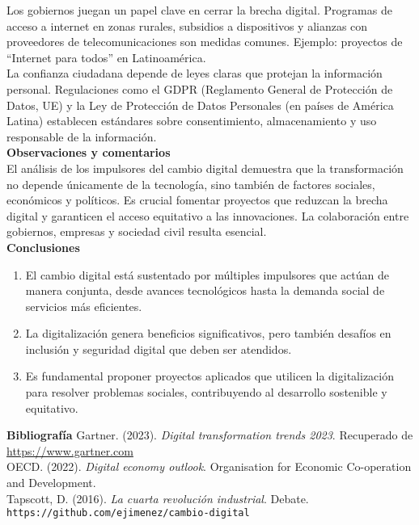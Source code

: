 \documentclass[12pt]{article}
\begin{document}
Los gobiernos juegan un papel clave en cerrar la brecha digital. Programas de acceso a internet en zonas rurales, subsidios a dispositivos y alianzas con proveedores de telecomunicaciones son medidas comunes. Ejemplo: proyectos de “Internet para todos” en Latinoamérica.\\

La confianza ciudadana depende de leyes claras que protejan la información personal. Regulaciones como el GDPR (Reglamento General de Protección de Datos, UE) y la Ley de Protección de Datos Personales (en países de América Latina) establecen estándares sobre consentimiento, almacenamiento y uso responsable de la información.\\


\textbf{Observaciones y comentarios}\\
El análisis de los impulsores del cambio digital demuestra que la transformación no depende 
únicamente de la tecnología, sino también de factores sociales, económicos y políticos. 
Es crucial fomentar proyectos que reduzcan la brecha digital y garanticen el acceso equitativo 
a las innovaciones. La colaboración entre gobiernos, empresas y sociedad civil resulta esencial.\\

\textbf{Conclusiones}\\
\begin{enumerate}
\item El cambio digital está sustentado por múltiples impulsores que actúan de manera conjunta, 
desde avances tecnológicos hasta la demanda social de servicios más eficientes.
\item La digitalización genera beneficios significativos, pero también desafíos en inclusión y 
seguridad digital que deben ser atendidos.
\item Es fundamental proponer proyectos aplicados que utilicen la digitalización para resolver 
problemas sociales, contribuyendo al desarrollo sostenible y equitativo.\\
\end{enumerate}

\textbf{Bibliografía}
Gartner. (2023). \textit{Digital transformation trends 2023}. Recuperado de \url{https://www.gartner.com} \\
OECD. (2022). \textit{Digital economy outlook}. Organisation for Economic Co-operation and Development. \\
Tapscott, D. (2016). \textit{La cuarta revolución industrial}. Debate. \\

\texttt{https://github.com/ejimenez/cambio-digital}
\end{document}
